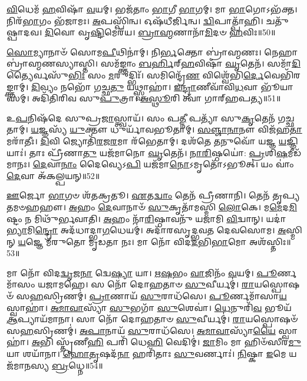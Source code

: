 \-\ul{𑌵𑌿}\-𑌧𑍇𑌮᳴ \ul{𑌹}\-𑌵𑌿𑌷𑌾᳴ \ul{𑌵}\-𑌯𑌮𑍍।
𑌭𑌜᳴𑌤𑌾𑌂 \ul{𑌭𑌾}\-𑌗𑍀 \ul{𑌭𑌾}\-𑌗𑌮𑍍।
𑌮𑌾 \ul{𑌭𑌾}\-𑌗𑍋\-𑌽𑌭᳴𑌕𑍍𑌤।
𑌨𑌿𑌰᳴\-\ul{𑌭𑌾}\-𑌗𑌂 𑌭᳴𑌜𑌾𑌮𑌃।
\-\ul{𑌅}\-𑌪𑌸𑍍𑌪𑌿᳴𑌨𑍍𑌵।
𑌓𑌷᳴𑌧𑍀𑌰𑍍𑌜𑌿𑌨𑍍𑌵।
\-\ul{𑌦𑍍𑌵𑌿}\-𑌪𑌾𑌤𑍍𑌪𑌾᳴𑌹𑌿।
𑌚𑌤𑍁᳴𑌷𑍍𑌪𑌾𑌦𑌵।
\-\ul{𑌦𑌿}\-𑌵𑍋 𑌵𑍃\-\ul{𑌷𑍍𑌟𑌿}\-𑌮𑍇𑌰᳴𑌯।
\-\ul{𑌬𑍍𑌰𑌾}\-\-\ul{𑌹𑍍𑌮}\-𑌣𑌾𑌨𑌾᳴\-\ul{𑌮𑌿}\-𑌦𑍞 \ul{𑌹}\-𑌵𑌿𑌃॥50॥

\-\ul{𑌸𑍋}\-𑌮𑍍𑌯𑌾𑌨𑌾𑍞᳴ 𑌸𑍋𑌮\-\ul{𑌪𑍀}\-𑌥𑌿𑌨𑌾॑𑌮𑍍।
𑌨𑌿\-\ul{𑌰𑍍𑌭}\-𑌕𑍍𑌤𑍋 𑌬𑍍𑌰𑌾॑𑌹𑍍𑌮𑌣𑌃।
𑌨𑍇𑌹𑌾 𑌬𑍍𑌰𑌾॑𑌹𑍍𑌮𑌣𑌸𑍍𑌯𑌾𑌸𑍍𑌤𑌿।
𑌸𑌮᳴𑌙𑍍𑌕𑍍𑌤𑌾𑌂 \ul{𑌬}\-\-\ul{𑌰𑍍}\-𑌹𑌿𑌰𑍍‌\mbox{}\-\ul{𑌹}\-𑌵𑌿𑌷𑌾᳴ \ul{𑌘𑍃}\-𑌤𑍇𑌨᳴।
𑌸𑌮𑌾᳴\-\ul{𑌦𑌿}\-𑌤𑍍𑌯𑍈𑌰𑍍𑌵𑌸𑍁᳴\-\ul{𑌭𑌿𑌃} 𑌸𑌂 \ul{𑌮}\-𑌰𑍁𑌦𑍍𑌭𑌿𑌃᳴।
𑌸𑌮𑌿𑌨𑍍𑌦𑍍𑌰𑍇᳴\-\ul{𑌣} 𑌵𑌿𑌶𑍍𑌵𑍇᳴𑌭𑌿\-\ul{𑌰𑍍𑌦𑍇}\-𑌵𑍇𑌭𑌿᳴𑌰𑌙𑍍𑌕𑍍𑌤𑌾𑌮𑍍।
\-\ul{𑌦𑌿}\-𑌵𑍍𑌯𑌂 𑌨𑌭𑍋᳴ 𑌗𑌚𑍍𑌛\-\ul{𑌤𑍁} 𑌯𑌥𑍍𑌸𑍍𑌵𑌾𑌹𑌾॑।
\-\ul{𑌇}\-\-\ul{𑌨𑍍𑌦𑍍𑌰𑌾}\-𑌣𑍀𑌵𑌾᳴𑌵𑌿\-\ul{𑌧}\-𑌵𑌾 𑌭𑍂᳴𑌯𑌾𑌸𑌮𑍍।
𑌅𑌦𑌿᳴𑌤𑌿𑌰𑌿𑌵 𑌸𑍁\-\ul{𑌪𑍁}\-𑌤𑍍𑌰𑌾।
\-\ul{𑌅}\-\-\ul{𑌸𑍍𑌥𑍂}\-𑌰𑌿 𑌤𑍍𑌵𑌾᳴ 𑌗𑌾𑌰𑍍‌\mbox{}𑌹𑌪𑌤𑍍𑌯॥51॥

𑌉\-\ul{𑌪}\-𑌨𑌿𑌷᳴𑌦𑍇 𑌸𑍁𑌪𑍍𑌰\-\ul{𑌜𑌾}\-𑌸𑍍𑌤𑍍𑌵𑌾𑌯᳴।
𑌸𑌂 𑌪\-\ul{𑌤𑍍𑌨𑍀} 𑌪𑌤𑍍𑌯𑌾᳴ 𑌸𑍁\-\ul{𑌕𑍃}\-𑌤𑍇𑌨᳴ 𑌗𑌚𑍍𑌛𑌤𑌾𑌮𑍍।
\-\ul{𑌯}\-𑌜𑍍𑌞𑌸𑍍𑌯᳴ \ul{𑌯𑍁}\-𑌕𑍍𑌤𑍗 𑌧𑍁𑌰𑍍𑌯𑌾᳴𑌵𑌭𑍂𑌤𑌾𑌮𑍍।
\-\ul{𑌸}\-\-\ul{𑌞𑍍𑌜𑌾}\-\-\ul{𑌨𑌾}\-𑌨𑍗 𑌵𑌿𑌜᳴𑌹\-\ul{𑌤𑌾}\-𑌮𑌰𑌾᳴𑌤𑍀𑌃।
\-\ul{𑌦𑌿}\-𑌵𑌿 𑌜𑍍𑌯𑍋𑌤𑌿᳴\-\ul{𑌰}\-𑌜\-\ul{𑌰}\-𑌮𑌾 𑌰᳴𑌭𑍇𑌤𑌾𑌮𑍍।
𑌦𑌶᳴𑌤𑍇 \ul{𑌤}\-𑌨𑍁𑌵𑍋᳴ 𑌯𑌜𑍍𑌞 \ul{𑌯}\-𑌜𑍍𑌞𑌿𑌯𑌾𑌃॑।
𑌤𑌾𑌃 𑌪𑍍𑌰𑍀᳴𑌣𑌾\-\ul{𑌤𑍁} 𑌯𑌜᳴𑌮𑌾𑌨𑍋 \ul{𑌘𑍃}\-𑌤𑍇𑌨᳴।
\-\ul{𑌨𑌾}\-\-\ul{𑌰𑌿}\-𑌷𑍍𑌠𑌯𑍋॑: \ul{𑌪𑍍𑌰}\-𑌶𑌿\-\ul{𑌷}\-𑌮𑍀𑌡᳴𑌮𑌾𑌨𑌃।
\-\ul{𑌦𑍇}\-𑌵𑌾\-\ul{𑌨𑌾𑌂} 𑌦𑍈𑌵𑍍𑌯𑍇𑌽\-\ul{𑌪𑌿} 𑌯𑌜᳴𑌮𑌾\-\ul{𑌨𑍋}\-\-𑌽𑌮𑍃𑌤𑍋᳴\-𑌽𑌭𑍂𑌤𑍍।
𑌯𑌂 𑌵𑌾𑌂॑ \ul{𑌦𑍇}\-𑌵𑌾 𑌅᳴𑌕𑌲𑍍𑌪𑌯𑌨𑍍॥52॥

\-\ul{𑌊}\-𑌰𑍍𑌜𑍋 \ul{𑌭𑌾}\-𑌗𑍞 𑌶᳴𑌤𑌕𑍍𑌰𑌤𑍂।
\-\ul{𑌏}\-𑌤\-\ul{𑌦𑍍𑌵𑌾𑌂} 𑌤𑍇𑌨᳴ 𑌪𑍍𑌰𑍀𑌣𑌾𑌨𑌿।
𑌤𑍇𑌨᳴ 𑌤𑍃𑌪𑍍𑌯𑌤𑌮𑍞𑌹𑌹𑍗।
\-\ul{𑌅}\-𑌹𑌂 \ul{𑌦𑍇}\-𑌵𑌾𑌨𑌾𑍞᳴ \ul{𑌸𑍁}\-𑌕𑍃𑌤𑌾᳴𑌮𑌸𑍍𑌮𑌿 \ul{𑌲𑍋}\-𑌕𑍇।
𑌮\-\ul{𑌮𑍇}\-𑌦\-\ul{𑌮𑌿}\-𑌷𑍍𑌟𑌂 𑌨 𑌮𑌿𑌥𑍁᳴𑌰𑍍𑌭𑌵𑌾𑌤𑌿।
\-\ul{𑌅}\-𑌹𑌂 𑌨𑌾᳴\-\ul{𑌰𑌿}\-𑌷𑍍𑌠𑌾𑌵𑌨𑍁᳴ 𑌯𑌜𑌾𑌮𑌿 \ul{𑌵𑌿}\-𑌦𑍍𑌵𑌾𑌨𑍍।
𑌯𑌦𑌾॑\-\ul{𑌭𑍍𑌯𑌾}\-𑌮𑌿\-\ul{𑌨𑍍𑌦𑍍𑌰𑍋} 𑌅𑌦᳴𑌧𑌾𑌦𑍍𑌭𑌾\-\ul{𑌗}\-𑌧𑍇𑌯𑌮𑍍॑।
𑌅𑌦𑌾᳴𑌰𑌸𑍃𑌦𑍍𑌭𑌵𑌤 𑌦𑍇𑌵𑌸𑍋𑌮।
\-\ul{𑌅}\-𑌸𑍍𑌮𑌿𑌨𑍍 \ul{𑌯}\-𑌜𑍍𑌞𑍇 𑌮᳴𑌰𑍁𑌤𑍋 𑌮𑍃𑌡𑌤𑌾 𑌨𑌃।
𑌮𑌾 𑌨𑍋᳴ 𑌵𑌿𑌦\-\ul{𑌦}\-𑌭𑌿\-\ul{𑌭𑌾}\-𑌮𑍋 𑌅𑌶᳴𑌸𑍍𑌤𑌿𑌃॥53॥

𑌮𑌾 𑌨𑍋᳴ 𑌵𑌿𑌦\-\ul{𑌦𑍍𑌵𑍃}\-𑌜\-\ul{𑌨𑌾} 𑌦𑍍𑌵𑍇\-\ul{𑌷𑍍𑌯𑌾} 𑌯𑌾।
\-\ul{𑌋}\-\-\ul{𑌷}\-𑌭𑌂 \ul{𑌵𑌾}\-𑌜𑌿𑌨𑌂᳴ \ul{𑌵}\-𑌯𑌮𑍍।
\-\ul{𑌪𑍂}\-𑌰𑍍𑌣𑌮𑌾᳴𑌸𑌂 𑌯𑌜𑌾𑌮𑌹𑍇।
𑌸 𑌨𑍋᳴ 𑌦𑍋𑌹𑌤𑌾𑍞 \ul{𑌸𑍁}\-𑌵𑍀𑌰𑍍𑌯𑌮𑍍॑।
\-\ul{𑌰𑌾}\-𑌯𑌸𑍍𑌪𑍋𑌷𑍞᳴ 𑌸\-\ul{𑌹}\-𑌸𑍍𑌰𑌿𑌣𑌮𑍍॑।
\-\ul{𑌪𑍍𑌰𑌾}\-𑌣𑌾𑌯᳴ \ul{𑌸𑍁}\-𑌰𑌾𑌧᳴𑌸𑍇।
\-\ul{𑌪𑍂}\-𑌰𑍍𑌣𑌮𑌾᳴𑌸𑌾\-\ul{𑌯} 𑌸𑍍𑌵𑌾𑌹𑌾॑।
\-\ul{𑌅}\-\-\ul{𑌮𑌾}\-\-\ul{𑌵𑌾}\-𑌸𑍍𑌯𑌾᳴ \ul{𑌸𑍁}\-𑌭𑌗𑌾᳴ \ul{𑌸𑍁}\-𑌶𑍇𑌵𑌾॑।
\-\ul{𑌧𑍇}\-𑌨𑍁𑌰𑌿᳴\-\ul{𑌵} 𑌭𑍂𑌯᳴ \ul{𑌆}\-𑌪𑍍𑌯𑌾𑌯᳴𑌮𑌾𑌨𑌾।
𑌸𑌾 𑌨𑍋᳴ 𑌦𑍋𑌹𑌤𑌾𑍞 \ul{𑌸𑍁}\-𑌵𑍀𑌰𑍍𑌯𑌮𑍍॑।
\-\ul{𑌰𑌾}\-𑌯𑌸𑍍𑌪𑍋𑌷𑍞᳴ 𑌸\-\ul{𑌹}\-𑌸𑍍𑌰𑌿𑌣𑌮𑍍॑।
\-\ul{𑌅}\-\-\ul{𑌪𑌾}\-𑌨𑌾𑌯᳴ \ul{𑌸𑍁}\-𑌰𑌾𑌧᳴𑌸𑍇।
\-\ul{𑌅}\-\-\ul{𑌮𑌾}\-\-\ul{𑌵𑌾}\-𑌸𑍍𑌯𑌾᳴\-\ul{𑌯𑍈} 𑌸𑍍𑌵𑌾𑌹𑌾॑।
\-\ul{𑌅}\-𑌭𑌿 𑌸𑍍𑌤𑍃᳴𑌣𑍀\-\ul{𑌹𑌿} 𑌪𑌰𑌿᳴ 𑌧𑍇\-\ul{𑌹𑌿} 𑌵𑍇𑌦𑌿𑌮𑍍॑।
\-\ul{𑌜𑌾}\-𑌮𑌿𑌂 𑌮𑌾 𑌹𑌿𑍞᳴𑌸𑍀𑌰\-\ul{𑌮𑍁}\-𑌯𑌾 𑌶𑌯𑌾᳴𑌨𑌾।
\-\ul{𑌹𑍋}\-\-\ul{𑌤𑍃}\-𑌷𑌦᳴\-\ul{𑌨𑌾} 𑌹𑌰𑌿᳴𑌤𑌾𑌃 \ul{𑌸𑍁}\-𑌵𑌰𑍍𑌣𑌾𑌃॑।
\-\ul{𑌨𑌿}\-𑌷𑍍𑌕𑌾 \ul{𑌇}\-𑌮𑍇 𑌯𑌜᳴𑌮𑌾𑌨𑌸𑍍𑌯 \ul{𑌬𑍍𑌰}\-𑌧𑍍𑌨𑍇॥54॥


